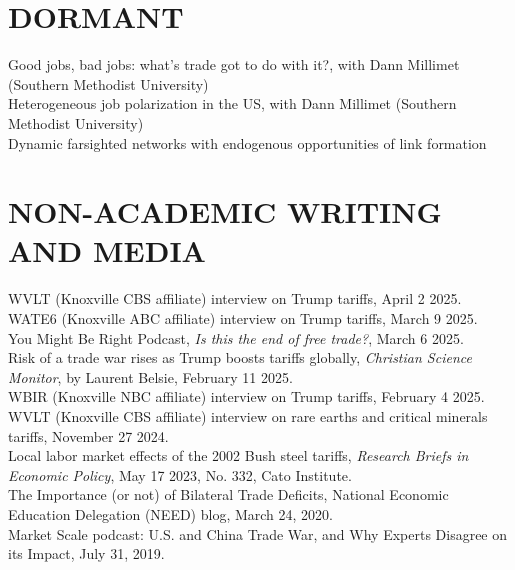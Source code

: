 \documentclass[11pt]{res}
\begin{document}
\begin{resume}
\section{DORMANT}\vspace{1.5mm}
{Good jobs, bad jobs: what's trade got to do with it?}, with Dann Millimet (Southern Methodist University)\vspace{1.5mm}\\
{Heterogeneous job polarization in the US}, with Dann Millimet (Southern Methodist University)\vspace{1.5mm}\\
{Dynamic farsighted networks with endogenous opportunities of link formation}

\section{NON-ACADEMIC WRITING AND MEDIA}\vspace{1.5mm}
WVLT (Knoxville CBS affiliate) interview on Trump tariffs, April 2 2025.\vspace{1.5mm}\\
WATE6 (Knoxville ABC affiliate) interview on Trump tariffs, March 9 2025.\vspace{1.5mm}\\
You Might Be Right Podcast, \emph{Is this the end of free trade?}, March 6 2025.\vspace{1.5mm}\\
Risk of a trade war rises as Trump boosts tariffs globally, \textit{Christian Science Monitor}, by Laurent Belsie, February 11 2025.\vspace{1.5mm}\\
WBIR (Knoxville NBC affiliate) interview on Trump tariffs, February 4 2025.\vspace{1.5mm}\\
WVLT (Knoxville CBS affiliate) interview on rare earths and critical minerals tariffs, November 27 2024.\vspace{1.5mm}\\
Local labor market effects of the 2002 Bush steel tariffs, \emph{Research Briefs in Economic Policy}, May 17 2023, No. 332, Cato Institute. \vspace{1.5mm}\\
The Importance (or not) of Bilateral Trade Deficits, National Economic Education Delegation (NEED) blog, March 24, 2020.\vspace{1.5mm}\\
Market Scale podcast: U.S. and China Trade War, and Why Experts Disagree on its Impact, July 31, 2019.\vspace{1.5mm}\\

\end{resume}
\end{document}
